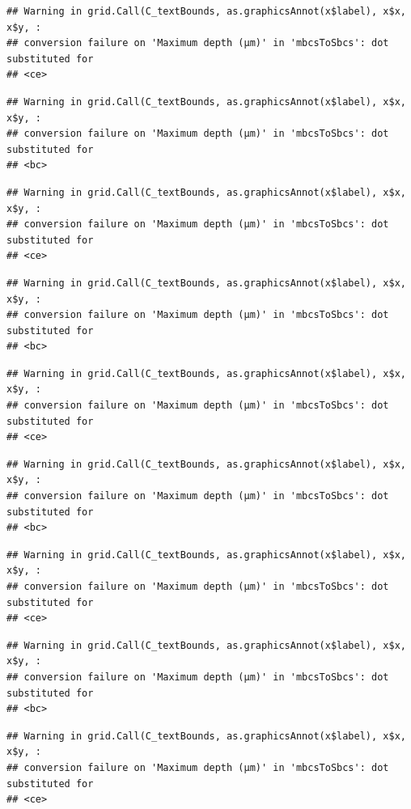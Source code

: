 \documentclass[
]{article}
\begin{document}
\begin{verbatim}
## Warning in grid.Call(C_textBounds, as.graphicsAnnot(x$label), x$x, x$y, :
## conversion failure on 'Maximum depth (μm)' in 'mbcsToSbcs': dot substituted for
## <ce>
\end{verbatim}

\begin{verbatim}
## Warning in grid.Call(C_textBounds, as.graphicsAnnot(x$label), x$x, x$y, :
## conversion failure on 'Maximum depth (μm)' in 'mbcsToSbcs': dot substituted for
## <bc>
\end{verbatim}

\begin{verbatim}
## Warning in grid.Call(C_textBounds, as.graphicsAnnot(x$label), x$x, x$y, :
## conversion failure on 'Maximum depth (μm)' in 'mbcsToSbcs': dot substituted for
## <ce>
\end{verbatim}

\begin{verbatim}
## Warning in grid.Call(C_textBounds, as.graphicsAnnot(x$label), x$x, x$y, :
## conversion failure on 'Maximum depth (μm)' in 'mbcsToSbcs': dot substituted for
## <bc>
\end{verbatim}

\begin{verbatim}
## Warning in grid.Call(C_textBounds, as.graphicsAnnot(x$label), x$x, x$y, :
## conversion failure on 'Maximum depth (μm)' in 'mbcsToSbcs': dot substituted for
## <ce>
\end{verbatim}

\begin{verbatim}
## Warning in grid.Call(C_textBounds, as.graphicsAnnot(x$label), x$x, x$y, :
## conversion failure on 'Maximum depth (μm)' in 'mbcsToSbcs': dot substituted for
## <bc>
\end{verbatim}

\begin{verbatim}
## Warning in grid.Call(C_textBounds, as.graphicsAnnot(x$label), x$x, x$y, :
## conversion failure on 'Maximum depth (μm)' in 'mbcsToSbcs': dot substituted for
## <ce>
\end{verbatim}

\begin{verbatim}
## Warning in grid.Call(C_textBounds, as.graphicsAnnot(x$label), x$x, x$y, :
## conversion failure on 'Maximum depth (μm)' in 'mbcsToSbcs': dot substituted for
## <bc>
\end{verbatim}

\begin{verbatim}
## Warning in grid.Call(C_textBounds, as.graphicsAnnot(x$label), x$x, x$y, :
## conversion failure on 'Maximum depth (μm)' in 'mbcsToSbcs': dot substituted for
## <ce>
\end{verbatim}
\end{document}

